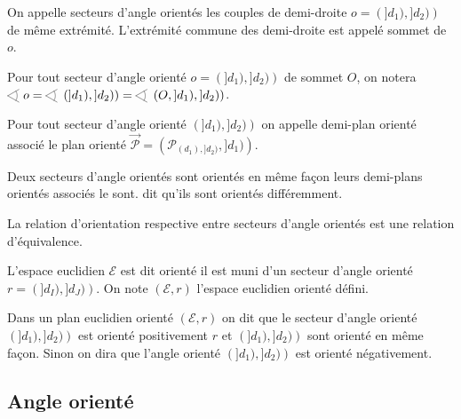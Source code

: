\begin{defi}
    On appelle secteurs d'angle orientés les couples de demi-droite $o = \left(]d_1),]d_2)\right)$ de même extrémité. L'extrémité commune des demi-droite est appelé sommet de $o$.
\end{defi}
\begin{rema}
    Pour tout secteur d'angle orienté $o = \left(]d_1),]d_2)\right)$ de sommet $O$, on notera $\anglesaillant o = \anglesaillant \left(]d_1),]d_2)\right)= \anglesaillant\left(O,]d_1),]d_2)\right)$.
\end{rema}
\begin{defi}
    Pour tout secteur d'angle orienté $\left(]d_1),]d_2)\right)$ on appelle demi-plan orienté associé le plan orienté $\overrightarrow{\mathcal{P}}=\left(\mathcal{P}_{(d_1),]d_2)},]d_1)\right)$.
\end{defi}
\begin{defi}
    Deux secteurs d'angle orientés sont orientés en même façon \ssi leurs demi-plans orientés associés le sont.  dit qu'ils sont orientés différemment. 
\end{defi}
\begin{prop}
    La relation d'orientation respective entre secteurs d'angle orientés est une relation d'équivalence.
\end{prop}
\begin{defi}
L'espace euclidien $\mathcal{E}$ est dit orienté \ssi il est muni d'un secteur d'angle orienté $r = \left(]d_I),]d_J)\right)$. On note $(\mathcal{E},r)$ l'espace euclidien orienté défini.
\end{defi}
\begin{defi}[Orientation]
Dans un plan euclidien orienté $(\mathcal{E},r)$ on dit que le secteur d'angle orienté $\left(]d_1),]d_2)\right)$ est orienté positivement \ssi $r$ et $\left(]d_1),]d_2)\right)$ sont orienté en même façon. Sinon on dira que l'angle orienté $\left(]d_1),]d_2)\right)$ est orienté négativement.
\end{defi}

        \subsection{Angle orienté}

